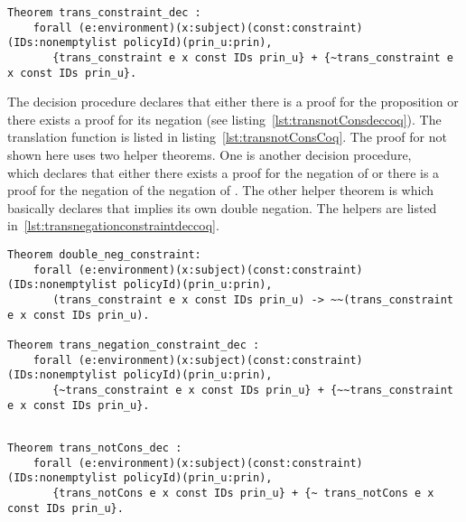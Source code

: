 \begin{minipage}[c]{0.95\textwidth}
\begin{lstlisting}
Theorem trans_constraint_dec :
    forall (e:environment)(x:subject)(const:constraint)(IDs:nonemptylist policyId)(prin_u:prin),
       {trans_constraint e x const IDs prin_u} + {~trans_constraint e x const IDs prin_u}.
\end{lstlisting}
\end{minipage}

The decision procedure  declares that either there is a proof for the proposition  or there exists a proof for its negation (see listing~\ref{lst:transnotConsdeccoq}). The translation function  is listed in listing~\ref{lst:transnotConsCoq}. The proof for  not shown here uses two helper theorems. One is another decision procedure, \\  which declares that either there exists a proof for the negation of  or there is a proof for the negation of the negation of . The other helper theorem is  which basically declares that  implies its own double negation. The helpers are listed in~\ref{lst:transnegationconstraintdeccoq}.

\begin{lstlisting}
Theorem double_neg_constraint:
    forall (e:environment)(x:subject)(const:constraint)(IDs:nonemptylist policyId)(prin_u:prin),
       (trans_constraint e x const IDs prin_u) -> ~~(trans_constraint e x const IDs prin_u).
  
Theorem trans_negation_constraint_dec :
    forall (e:environment)(x:subject)(const:constraint)(IDs:nonemptylist policyId)(prin_u:prin),
       {~trans_constraint e x const IDs prin_u} + {~~trans_constraint e x const IDs prin_u}.
       
\end{lstlisting}

\begin{minipage}[c]{0.95\textwidth}
\begin{lstlisting}
Theorem trans_notCons_dec :
    forall (e:environment)(x:subject)(const:constraint)(IDs:nonemptylist policyId)(prin_u:prin),
       {trans_notCons e x const IDs prin_u} + {~ trans_notCons e x const IDs prin_u}.

\end{lstlisting}
\end{minipage}


